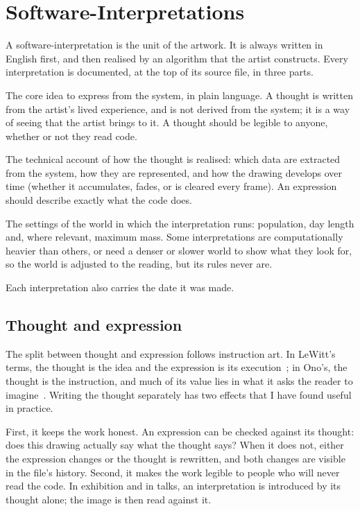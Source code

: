 \section{Software-Interpretations}
\label{sec:method}

A software-interpretation is the unit of the artwork. It is always written in English first, and then realised by an algorithm that the artist constructs. Every interpretation is documented, at the top of its source file, in three parts.

\begin{description}[leftmargin=1.2em, font=\normalfont\itshape]
  \item[Thought.] The core idea to express from the system, in plain language. A thought is written from the artist's lived experience, and is not derived from the system; it is a way of seeing that the artist brings to it. A thought should be legible to anyone, whether or not they read code.
  \item[Expression.] The technical account of how the thought is realised: which data are extracted from the system, how they are represented, and how the drawing develops over time (whether it accumulates, fades, or is cleared every frame). An expression should describe exactly what the code does.
  \item[Parameters.] The settings of the world in which the interpretation runs: population, day length and, where relevant, maximum mass. Some interpretations are computationally heavier than others, or need a denser or slower world to show what they look for, so the world is adjusted to the reading, but its rules never are.
\end{description}

Each interpretation also carries the date it was made.

\subsection{Thought and expression}

The split between thought and expression follows instruction art. In LeWitt's terms, the thought is the idea and the expression is its execution~\cite{lewitt1967}; in Ono's, the thought is the instruction, and much of its value lies in what it asks the reader to imagine~\cite{ono1964}. Writing the thought separately has two effects that I have found useful in practice.

First, it keeps the work honest. An expression can be checked against its thought: does this drawing actually say what the thought says? When it does not, either the expression changes or the thought is rewritten, and both changes are visible in the file's history. Second, it makes the work legible to people who will never read the code. In exhibition and in talks, an interpretation is introduced by its thought alone; the image is then read against it.

